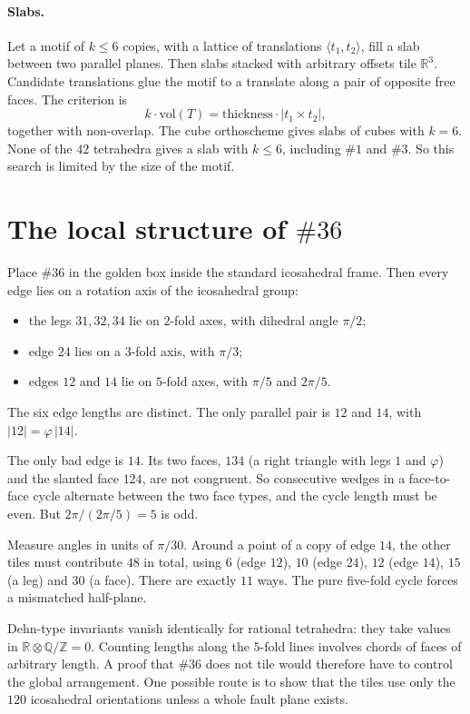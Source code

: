 \documentclass[11pt]{amsart}
\theoremstyle{definition}
\newcommand{\Q}{\mathbb{Q}}
\newcommand{\R}{\mathbb{R}}
\newcommand{\Z}{\mathbb{Z}}
\begin{document}
\paragraph{Slabs.} Let a motif of $k\le 6$ copies, with a lattice of translations $\langle t_1,t_2\rangle$, fill a slab
between two parallel planes. Then slabs stacked with arbitrary offsets tile $\R^3$. Candidate translations glue the motif
to a translate along a pair of opposite free faces. The criterion is
\[k\cdot\mathrm{vol}(T)=\text{thickness}\cdot|t_1\times t_2|,\]
together with non-overlap. The cube orthoscheme gives slabs of cubes with $k=6$. None of the $42$ tetrahedra gives a
slab with $k\le6$, including $\#1$ and $\#3$. So this search is limited by the size of the motif.

\section{The local structure of $\#36$}\label{sec:36}
Place $\#36$ in the golden box inside the standard icosahedral frame. Then every edge lies on a rotation axis of the
icosahedral group:
\begin{itemize}[leftmargin=1.5em]
\item the legs $31,32,34$ lie on $2$-fold axes, with dihedral angle $\pi/2$;
\item edge $24$ lies on a $3$-fold axis, with $\pi/3$;
\item edges $12$ and $14$ lie on $5$-fold axes, with $\pi/5$ and $2\pi/5$.
\end{itemize}
The six edge lengths are distinct. The only parallel pair is $12$ and $14$, with $|12|=\varphi\,|14|$.

The only bad edge is $14$. Its two faces, $134$ (a right triangle with legs $1$ and $\varphi$) and the slanted face $124$,
are not congruent. So consecutive wedges in a face-to-face cycle alternate between the two face types, and the cycle
length must be even. But $2\pi/(2\pi/5)=5$ is odd.

Measure angles in units of $\pi/30$. Around a point of a copy of edge $14$, the other tiles must contribute $48$ in total,
using $6$ (edge $12$), $10$ (edge $24$), $12$ (edge $14$), $15$ (a leg) and $30$ (a face). There are exactly $11$ ways.
The pure five-fold cycle forces a mismatched half-plane.

Dehn-type invariants vanish identically for rational tetrahedra: they take values in $\R\otimes\Q/\Z=0$. Counting lengths
along the $5$-fold lines involves chords of faces of arbitrary length. A proof that $\#36$ does not tile would therefore
have to control the global arrangement. One possible route is to show that the tiles use only the $120$ icosahedral
orientations unless a whole fault plane exists.
\end{document}
